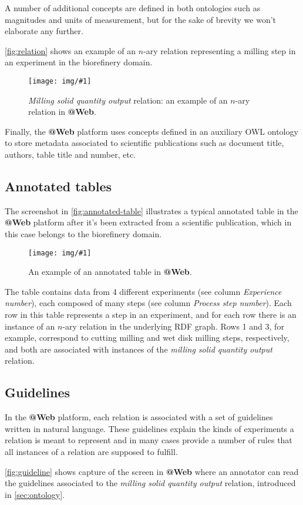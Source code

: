 \documentclass[a4paper, 10pt]{article}
\makeatletter
\newcommand{\atweb}{\textbf{@Web}\xspace}
\newcommand{\nary}{$n$-ary\xspace}
\newcommand{\img}[3]{
  \begin{figure}[H]
    \centering
    \texttt{[image: img/\#1]}
    \caption{#2}
    \label{#3}
  \end{figure}
}
\makeatother
\begin{document}
A number of additional concepts are defined in both ontologies such as
magnitudes and units of measurement, but for the sake of brevity we won't
elaborate any further.

\autoref{fig:relation} shows an example of an \nary relation representing a
milling step in an experiment in the biorefinery domain.


\img{relation.jpg}
    {
      \textit{Milling solid quantity output} relation: an example of an \nary
      relation in \atweb.
    }
    {fig:relation}

Finally, the \atweb platform uses concepts defined in an auxiliary OWL ontology
to store metadata associated to scientific publications such as document title,
authors, table title and number, etc.


\subsection{Annotated tables}

The screenshot in \autoref{fig:annotated-table} illustrates a typical annotated
table in the \atweb platform after it's been extracted from a scientific
publication, which in this case belongs to the biorefinery domain.

\img{annotated-table.jpg}
    {An example of an annotated table in \atweb.}
    {fig:annotated-table}

The table contains data from 4 different experiments (see column
\textit{Experience number}), each composed of many steps (see column
\textit{Process step number}). Each row in this table represents a step in an
experiment, and for each row there is an instance of an \nary relation in the
underlying RDF graph. Rows 1 and 3, for example, correspond to cutting milling
and wet disk milling steps, respectively, and both are associated with
instances of the \textit{milling solid quantity output} relation.


\subsection{Guidelines}

In the \atweb platform, each relation is associated with a set of guidelines
written in natural language. These guidelines explain the kinds of experiments
a relation is meant to represent and in many cases provide a number of rules
that all instances of a relation are supposed to fulfill.

\autoref{fig:guideline} shows capture of the screen in \atweb where an
annotator can read the guidelines associated to the \textit{milling solid
quantity output} relation, introduced in \autoref{sec:ontology}.
\end{document}
